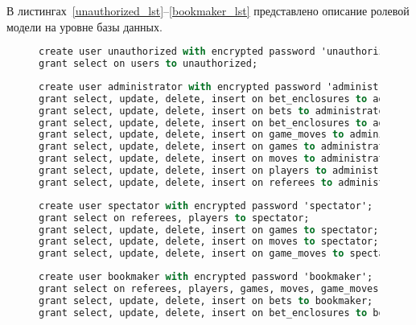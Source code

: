В листингах~\ref{unauthorized_lst}--\ref{bookmaker_lst} представлено описание ролевой модели на уровне базы данных.

\begin{figure}[H]
	\begin{lstlisting}[label=unauthorized_lst,caption=Описание роли неаторизованного пользователя,language=Caml]
create user unauthorized with encrypted password 'unauthorized';
grant select on users to unauthorized;
	\end{lstlisting}
\end{figure}
\begin{figure}[H]
	\begin{lstlisting}[label=administrator_lst,caption=Описание роли администратора,language=Caml]
create user administrator with encrypted password 'administrator';
grant select, update, delete, insert on bet_enclosures to administrator;
grant select, update, delete, insert on bets to administrator;
grant select, update, delete, insert on bet_enclosures to administrator;
grant select, update, delete, insert on game_moves to administrator;
grant select, update, delete, insert on games to administrator;
grant select, update, delete, insert on moves to administrator;
grant select, update, delete, insert on players to administrator;
grant select, update, delete, insert on referees to administrator;
	\end{lstlisting}
\end{figure}
\begin{figure}[H]
	\begin{lstlisting}[label=spectator_lst,caption=Описание роли наблюдателя,language=Caml]
create user spectator with encrypted password 'spectator';
grant select on referees, players to spectator;
grant select, update, delete, insert on games to spectator;
grant select, update, delete, insert on moves to spectator;
grant select, update, delete, insert on game_moves to spectator;
	\end{lstlisting}
\end{figure}
\begin{figure}[H]
	\begin{lstlisting}[label=bookmaker_lst,caption=Описание роли букмекера,language=Caml]
create user bookmaker with encrypted password 'bookmaker';
grant select on referees, players, games, moves, game_moves to bookmaker;
grant select, update, delete, insert on bets to bookmaker;
grant select, update, delete, insert on bet_enclosures to bookmaker;
	\end{lstlisting}
\end{figure}

\clearpage
